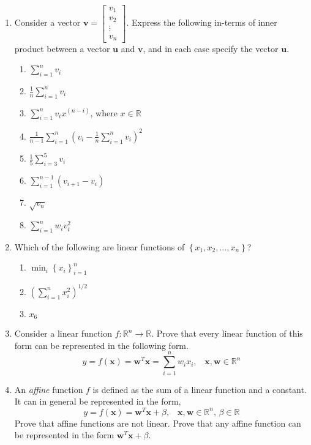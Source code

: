 \begin{enumerate}
    \item Consider a vector $\mathbf{v} = \begin{bmatrix*}v_1\\v_2\\\vdots\\v_n\end{bmatrix*}$. Express the following in-terms of inner product between a vector $\mathbf{u}$ and $\mathbf{v}$, and in each case specify the vector $\mathbf{u}$.
    \begin{enumerate}
        \item $\sum_{i=1}^nv_i$
        \item $\frac{1}{n}\sum_{i=1}^nv_i$
        \item $\sum_{i=1}^nv_ix^{\left(n - i\right)}$, where $x \in \mathbb{R}$
        \item $\frac{1}{n-1}\sum_{i=1}^n\left(v_i - \frac{1}{n}\sum_{i=1}^nv_i \right)^2$
        \item $\frac{1}{5}\sum_{i=3}^5 v_i$
        \item $\sum_{i=1}^{n-1} \left(v_{i+1} - v_i\right)$
        \item $\sqrt{v_n}$
        \item $\sum_{i=1}^nw_iv_i^2$
    \end{enumerate}
    
    \item Which of the following are linear functions of $\left\{x_1, x_2, \ldots,x_n\right\}$?
    \begin{enumerate}
        \item $\min_i \left\{x_i\right\}_{i=1}^{n}$
        \item $\left(\sum_{i=1}^n x_i^2\right)^{1/2}$
        \item $x_6$
    \end{enumerate}
    
    \item Consider a linear function $f: \mathbb{R}^n \rightarrow \mathbb{R}$. Prove that every linear function of this form can be represented in the following form.
    \[ y = f\left(\mathbf{x}\right) = \mathbf{w}^T\mathbf{x} = \sum_{i=1}^{n}w_ix_i, \,\,\,\,\, \mathbf{x}, \mathbf{w} \in \mathbb{R}^n \]

    \item An \textit{affine} function $f$ is defined as the sum of a linear function and a constant. It can in general be represented in the form, 
    \[ y = f\left(\mathbf{x}\right) = \mathbf{w}^T\mathbf{x} + \beta, \,\,\,\,\, \mathbf{x}, \mathbf{w} \in \mathbb{R}^n, \, \beta \in \mathbb{R} \]
    Prove that affine functions are not linear. Prove that any affine function can be represented in the form $\mathbf{w}^T\mathbf{x} + \beta$.


\end{enumerate}
